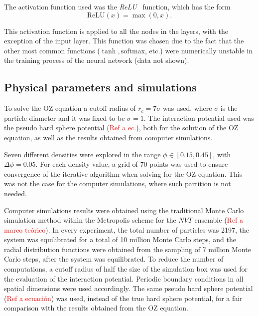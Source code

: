 The activation function used was the \emph{ReLU}~\cite{glorotDeepSparseRectifier2011}
function, which has the form
\begin{equation*}
    \text{ReLU}(x) = \max{(0, x)} .
\end{equation*}

This activation function is applied to all the nodes in the layers, with the exception
of the input layer. This function was chosen due to the fact that the other most common
functions ($\tanh, \text{softmax}$, etc.) were numerically unstable in the training process 
of the neural network (data not shown).

\subsection{Physical parameters and simulations}

To solve the OZ equation a cutoff radius of $r_c=7\sigma$ was used, where $\sigma$ is the
particle diameter and it was fixed to be $\sigma=1$.
The interaction potential used was the pseudo hard sphere potential (\textcolor{red}{Ref a ec.}), both
for the solution of the OZ equation, as well as the results obtained from computer simulations.

Seven different densities were explored in the range $\phi \in [\num{0.15}, \num{0.45}]$, 
with $\Delta \phi = \num{0.05}$.
For each density value, a grid of 70 points was used to ensure convergence of the iterative
algorithm when solving for the OZ equation. This was not the case for the computer 
simulations, where such partition is not needed.

Computer simulations results were obtained using the traditional Monte Carlo simulation
method within the Metropolis scheme for the $NVT$ ensemble (\textcolor{red}{Ref a marco teórico}). In every experiment, the total number of particles was 2197,
the system was equilibrated for a total of 10 million Monte Carlo steps, and the radial
distribution functions were obtained from the sampling of 7 million Monte Carlo steps, after
the system was equilibrated. To reduce the number of computations, a cutoff radius of
half the size of the simulation box was used for the evaluation of the interaction 
potential. Periodic boundary conditions in all spatial dimensions were used accordingly. 
The same pseudo hard sphere potential (\textcolor{red}{Ref a ecuación}) was used, instead
of the true hard sphere potential, for a fair comparison with the results obtained from the 
OZ equation.

